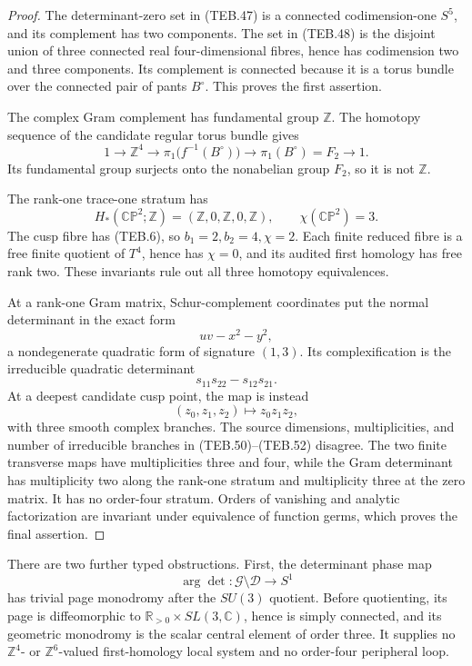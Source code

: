 \begin{proof}
The determinant-zero set in (TEB.47) is a connected codimension-one
\(S^5\), and its complement has two components.  The set in (TEB.48) is the
disjoint union of three connected real four-dimensional fibres, hence has
codimension two and three components.  Its complement is connected because
it is a torus bundle over the connected pair of pants \(B^\circ\).  This
proves the first assertion.

The complex Gram complement has fundamental group \(\mathbb Z\).  The
homotopy sequence of the candidate regular torus bundle gives
\[
 1\longrightarrow\mathbb Z^4\longrightarrow
 \pi_1\bigl(f^{-1}(B^\circ)\bigr)
 \longrightarrow\pi_1(B^\circ)=F_2\longrightarrow1.    \tag{TEB.49}
\]
Its fundamental group surjects onto the nonabelian group \(F_2\), so it is
not \(\mathbb Z\).

The rank-one trace-one stratum has
\[
 H_*(\mathbb{CP}^2;\mathbb Z)=(\mathbb Z,0,\mathbb Z,0,\mathbb Z),
 \qquad \chi(\mathbb{CP}^2)=3.
\]
The cusp fibre has (TEB.6), so \(b_1=2,b_2=4,\chi=2\).  Each finite reduced
fibre is a free finite quotient of \(T^4\), hence has \(\chi=0\), and its
audited first homology has free rank two.  These invariants rule out all three
homotopy equivalences.

At a rank-one Gram matrix, Schur-complement coordinates put the normal
determinant in the exact form
\[
 uv-x^2-y^2,
 \tag{TEB.50}
\]
a nondegenerate quadratic form of signature \((1,3)\).  Its complexification
is the irreducible quadratic determinant
\[
 s_{11}s_{22}-s_{12}s_{21}.
 \tag{TEB.51}
\]
At a deepest candidate cusp point, the map is instead
\[
 (z_0,z_1,z_2)\longmapsto z_0z_1z_2,                   \tag{TEB.52}
\]
with three smooth complex branches.  The source dimensions, multiplicities,
and number of irreducible branches in (TEB.50)--(TEB.52) disagree.  The two
finite transverse maps have multiplicities three and four, while the Gram
determinant has multiplicity two along the rank-one stratum and multiplicity
three at the zero matrix.  It has no order-four stratum.  Orders of vanishing
and analytic factorization are invariant under equivalence of function germs,
which proves the final assertion.
\end{proof}

There are two further typed obstructions.  First, the determinant phase map
\[
 \arg\det:\mathcal G\setminus\mathcal D\longrightarrow S^1
\]
has trivial page monodromy after the \(SU(3)\) quotient.  Before quotienting,
its page is diffeomorphic to
\(\mathbb R_{>0}\times SL(3,\mathbb C)\), hence is simply connected, and its
geometric monodromy is the scalar central element of order three.
It supplies no \(\mathbb Z^4\)- or \(\mathbb Z^6\)-valued first-homology local
system and no order-four peripheral loop.

